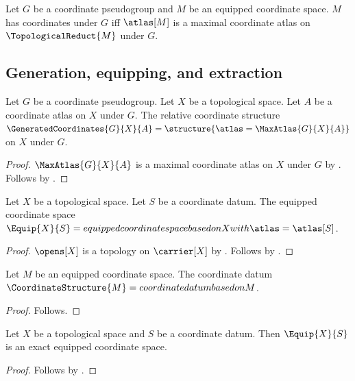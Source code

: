 \begin{definition}\label{equipped_coordinates}
    Let $G$ be a coordinate pseudogroup and $M$ be an equipped coordinate space.
    $M$ has coordinates under $G$ iff
        $\atlas[M]$ is a maximal coordinate atlas on $\TopologicalReduct{M}$ under $G$.
\end{definition}

\subsection{Generation, equipping, and extraction}

\begin{construction}\label{generated_coordinates}
    Let $G$ be a coordinate pseudogroup.
    Let $X$ be a topological space.
    Let $A$ be a coordinate atlas on $X$ under $G$.
    The relative coordinate structure $\GeneratedCoordinates{G}{X}{A}=
        \structure{\atlas=\MaxAtlas{G}{X}{A}}$ on $X$ under $G$.
\end{construction}
\begin{proof}
    $\MaxAtlas{G}{X}{A}$ is a maximal coordinate atlas on $X$ under $G$ by
        .
    Follows by .
\end{proof}

\begin{construction}\label{equip}
    Let $X$ be a topological space.
    Let $S$ be a coordinate datum.
    The equipped coordinate space $\Equip{X}{S}=
        equipped coordinate space based on X with \atlas=\atlas[S]$.
\end{construction}
\begin{proof}
    $\opens[X]$ is a topology on $\carrier[X]$ by
        .
    Follows by .
\end{proof}

\begin{construction}\label{coordinate_structure}
    Let $M$ be an equipped coordinate space.
    The coordinate datum $\CoordinateStructure{M}=coordinate datum based on M$.
\end{construction}
\begin{proof}
    Follows.
\end{proof}

\begin{theorem}\label{equip_is_exact}
    Let $X$ be a topological space and $S$ be a coordinate datum.
    Then $\Equip{X}{S}$ is an exact equipped coordinate space.
\end{theorem}
\begin{proof}
    Follows by .
\end{proof}

